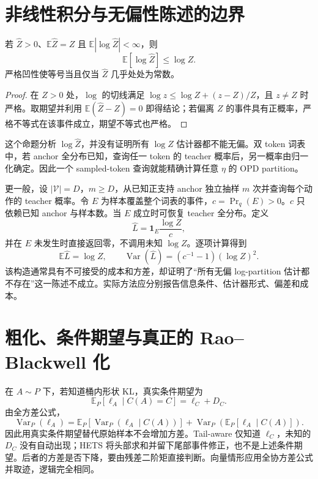 \documentclass[lang=cn,scheme=chinese,openany]{../book/elegantbook}
\newcommand{\E}{\mathbb E}
\newcommand{\Var}{\operatorname{Var}}
\begin{document}
\section{非线性积分与无偏性陈述的边界}
\label{inf:nonlinear}

\begin{proposition}
\label{inf:jensen}
若 $\widehat Z>0$、$\E\widehat Z=Z$ 且 $\E|\log\widehat Z|<\infty$，则
\begin{equation}
\E[\log\widehat Z]\leq\log Z.
\end{equation}
严格凹性使等号当且仅当 $\widehat Z$ 几乎处处为常数。
\end{proposition}
\begin{proof}
在 $Z>0$ 处，$\log$ 的切线满足 $\log z\leq\log Z+(z-Z)/Z$，且 $z\ne Z$ 时严格。取期望并利用 $\E(\widehat Z-Z)=0$ 即得结论；若偏离 $Z$ 的事件具有正概率，严格不等式在该事件成立，期望不等式也严格。
\end{proof}

这个命题分析 $\log\widehat Z$，并没有证明所有 $\log Z$ 估计器都不能无偏。双 token 词表中，若 anchor 全分布已知，查询任一 token 的 teacher 概率后，另一概率由归一化确定。因此一个 sampled-token 查询就能精确计算任意 $\eta$ 的 OPD partition。

更一般，设 $|\mathcal V|=D$，$m\geq D$，从已知正支持 anchor 独立抽样 $m$ 次并查询每个动作的 teacher 概率。令 $E$ 为样本覆盖整个词表的事件，$c=\Pr_q(E)>0$。$c$ 只依赖已知 anchor 与样本数。当 $E$ 成立时可恢复 teacher 全分布。定义
\begin{equation}
\widehat L=\mathbf1_E\frac{\log Z}{c},
\end{equation}
并在 $E$ 未发生时直接返回零，不调用未知 $\log Z$。逐项计算得到
\begin{equation}
\E\widehat L=\log Z,\qquad
\Var(\widehat L)=(c^{-1}-1)(\log Z)^2.
\end{equation}
该构造通常具有不可接受的成本和方差，却证明了“所有无偏 log-partition 估计都不存在”这一陈述不成立。实际方法应分别报告信息条件、估计器形式、偏差和成本。

\section{粗化、条件期望与真正的 Rao--Blackwell 化}
\label{inf:rao-blackwell}

在 $A\sim P$ 下，若知道桶内形状 KL，真实条件期望为
\begin{equation}
\E_P[\ell_A\mid C(A)=C]=\ell_C+D_C.
\end{equation}
由全方差公式，
\begin{equation}
\Var_P(\ell_A)
=\E_P[\Var_P(\ell_A\mid C(A))]
+\Var_P(\E_P[\ell_A\mid C(A)]).
\end{equation}
因此用真实条件期望替代原始样本不会增加方差。Tail-aware 仅知道 $\ell_C$，未知的 $D_C$ 没有自动出现；HETS 将头部求和并留下尾部事件修正，也不是上述条件期望。后者的方差是否下降，要由残差二阶矩直接判断。向量情形应用全协方差公式并取迹，逻辑完全相同。
\end{document}
